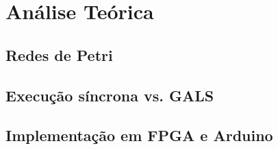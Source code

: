 \section{Análise Teórica}

\subsection{Redes de Petri}

\subsection{Execução síncrona vs. GALS}

\subsection{Implementação em FPGA e Arduino}

